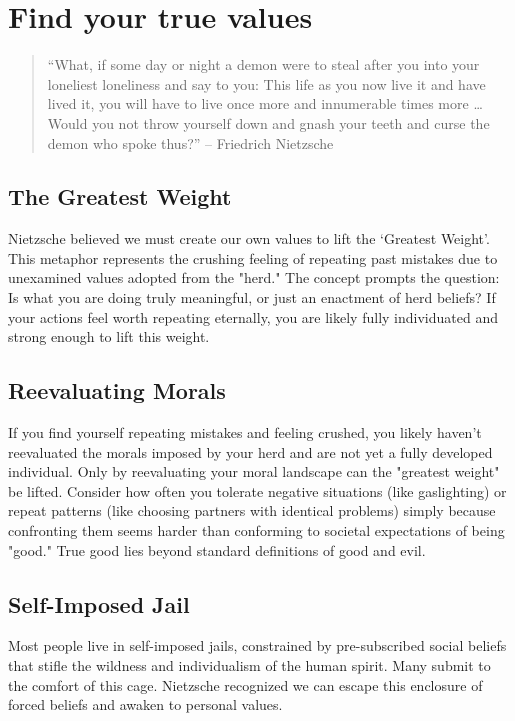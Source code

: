 \section{Find your true values}

\begin{quote}
    “What, if some day or night a demon were to steal after you into your loneliest loneliness and say to you: This life as you now live it and have lived it, you will have to live once more and innumerable times more … Would you not throw yourself down and gnash your teeth and curse the demon who spoke thus?” -- Friedrich Nietzsche
\end{quote}

\subsection*{The Greatest Weight}
Nietzsche believed we must create our own values to lift the ‘Greatest Weight’. This metaphor represents the crushing feeling of repeating past mistakes due to unexamined values adopted from the "herd." The concept prompts the question: Is what you are doing truly meaningful, or just an enactment of herd beliefs? If your actions feel worth repeating eternally, you are likely fully individuated and strong enough to lift this weight.

\subsection*{Reevaluating Morals}
If you find yourself repeating mistakes and feeling crushed, you likely haven't reevaluated the morals imposed by your herd and are not yet a fully developed individual. Only by reevaluating your moral landscape can the "greatest weight" be lifted. Consider how often you tolerate negative situations (like gaslighting) or repeat patterns (like choosing partners with identical problems) simply because confronting them seems harder than conforming to societal expectations of being "good." True good lies beyond standard definitions of good and evil.

\subsection*{Self-Imposed Jail}
Most people live in self-imposed jails, constrained by pre-subscribed social beliefs that stifle the wildness and individualism of the human spirit. Many submit to the comfort of this cage. Nietzsche recognized we can escape this enclosure of forced beliefs and awaken to personal values.


